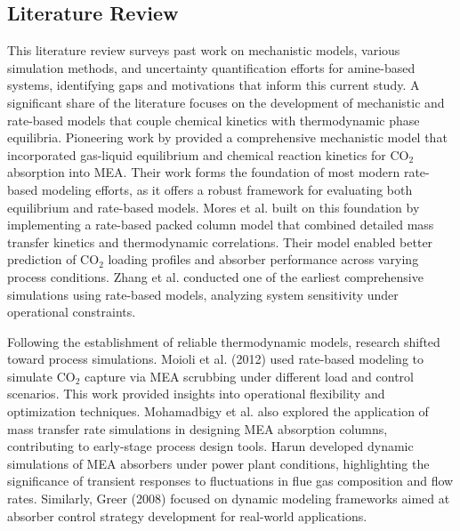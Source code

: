 \documentclass[a4paper,fleqn]{cas-sc}
\begin{document}
    \subsection{Literature Review}

    This literature review surveys past work on mechanistic models, various simulation methods, and uncertainty quantification efforts for amine-based systems, identifying gaps and motivations that inform this current study. A significant share of the literature focuses on the development of mechanistic and rate-based models that couple chemical kinetics with thermodynamic phase equilibria. Pioneering work by \citet{Freguia2003ModelingMonoethanolamine} provided a comprehensive mechanistic model that incorporated gas-liquid equilibrium and chemical reaction kinetics for CO$_2$ absorption into MEA. Their work forms the foundation of most modern rate-based modeling efforts, as it offers a robust framework for evaluating both equilibrium and rate-based models. Mores et al. \cite{Mores2012ASolution} built on this foundation by implementing a rate-based packed column model that combined detailed mass transfer kinetics and thermodynamic correlations. Their model enabled better prediction of CO$_2$ loading profiles and absorber performance across varying process conditions. Zhang et al. \cite{Zhang2009Rate-basedSolution} conducted one of the earliest comprehensive simulations using rate-based models, analyzing system sensitivity under operational constraints.

    Following the establishment of reliable thermodynamic models, research shifted toward process simulations. Moioli et al. (2012) \cite{Moioli2012SimulationModel} used rate-based modeling to simulate CO$_2$ capture via MEA scrubbing under different load and control scenarios. This work provided insights into operational flexibility and optimization techniques. Mohamadbigy et al. \cite{Mohamadbigy2005AmineSimulation} also explored the application of mass transfer rate simulations in designing MEA absorption columns, contributing to early-stage process design tools. Harun \cite{Harun2012DynamicPlants} developed dynamic simulations of MEA absorbers under power plant conditions, highlighting the significance of transient responses to fluctuations in flue gas composition and flow rates. Similarly, Greer (2008) \cite{Greer2008ModelingCapturing} focused on dynamic modeling frameworks aimed at absorber control strategy development for real-world applications.
\end{document}
